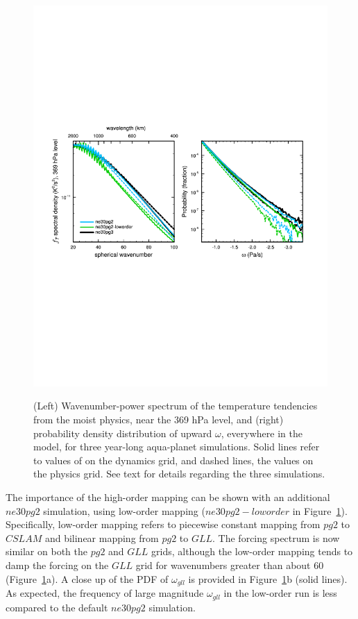 \documentclass{agujournal}
\begin{document}
\begin{figure}[t]
\begin{center}
\noindent\includegraphics[width=30pc,angle=0]{figs/panel_loworder.pdf}\\
\end{center}
\caption{(Left) Wavenumber-power spectrum of the temperature tendencies from the moist physics, near the 369 hPa level, and (right) probability density distribution of upward $\omega$, everywhere in the model, for three year-long aqua-planet simulations.  Solid lines refer to values of on the dynamics grid, and dashed lines, the values on the physics grid. See text for details regarding the three simulations.}
\label{fig:loworder}
\end{figure}

The importance of the high-order mapping can be shown with an additional $ne30pg2$ simulation, using low-order mapping ($ne30pg2-loworder$ in Figure~\ref{fig:loworder}). Specifically, low-order mapping refers to piecewise constant mapping from $pg2$ to $CSLAM$ and bilinear mapping from $pg2$ to $GLL$. The forcing spectrum is now similar on both the $pg2$ and $GLL$ grids, although the low-order mapping tends to damp the forcing on the $GLL$ grid for wavenumbers greater than about 60 (Figure~\ref{fig:loworder}a). A close up of the PDF of $\omega_{gll}$ is provided in Figure~\ref{fig:loworder}b (solid lines). As expected, the frequency of large magnitude $\omega_{gll}$ in the low-order run is less compared to the default $ne30pg2$ simulation. 
\end{document}
